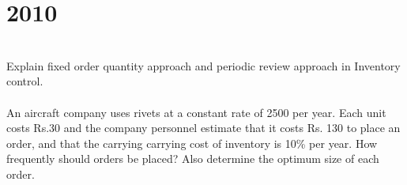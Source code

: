 \section*{2010}
\vspace{-.5cm}
\hrulefill \smallskip\\
 Explain fixed order quantity approach and periodic review approach in Inventory control.
\\\\
 An aircraft company uses rivets at a constant rate of 2500 per year. Each unit costs Rs.30 and the company personnel estimate that it costs Rs. 130 to place an order, and that the carrying carrying cost of inventory is 10\% per year. How frequently should orders be placed? Also determine the optimum size of each order. 